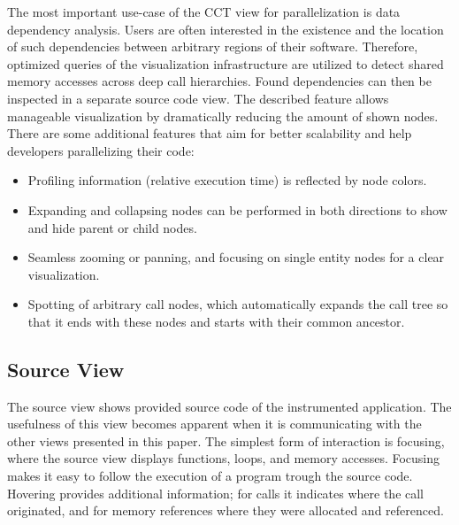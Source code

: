 The most important use-case of the CCT view for parallelization is data
dependency analysis. Users are often interested in the existence and the
location of such dependencies between arbitrary regions of their software.
Therefore, optimized queries of the visualization infrastructure are utilized
to detect shared memory accesses across deep call hierarchies. Found
dependencies can then be inspected in a separate source code view. The
described feature allows manageable visualization by dramatically reducing the
amount of shown nodes. There are some additional features that aim for better
scalability and help developers parallelizing their code:

\begin{itemize}
	\item Profiling information (relative execution time) is reflected by node
colors.
	\item Expanding and collapsing nodes can be performed in both
directions to show and hide parent or child nodes.
	\item Seamless zooming or panning, and focusing on single entity nodes for
a clear visualization.
	\item Spotting of arbitrary call nodes, which automatically expands the call
tree so that it ends with these nodes and starts with their common ancestor.
\end{itemize}

\subsection{Source View}
The source view shows provided source code of the instrumented application. The
usefulness of this view becomes apparent when it is communicating with the
other views presented in this paper. The simplest form of interaction is
focusing, where the source view displays functions, loops, and memory accesses.
Focusing makes it easy to follow the execution of a program trough the source
code. Hovering provides additional information; for calls it indicates where
the call originated, and for memory references where they were allocated and
referenced.